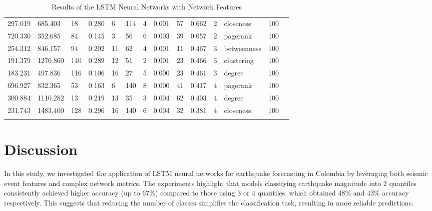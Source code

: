 \documentclass[sn-mathphys-num]{sn-jnl}
\begin{document}
\begin{table}
{\begin{tabular}{@{}llllllllllllll@{}}
            297.019  & 685.403   & 18       & 0.280     & 6          & 114         & 4           & 0.001 & 57         & 0.662    & 2         & closeness        & 100       \\
            720.330  & 352.685   & 84       & 0.145     & 3          & 56          & 6           & 0.003 & 39         & 0.657    & 2         & pagerank         & 100       \\
            \midrule
            254.312  & 846.157   & 94       & 0.202     & 11         & 62          & 4           & 0.001 & 11         & 0.467    & 3         & betweenness      & 100       \\
            191.379  & 1270.860  & 140      & 0.289     & 12         & 51          & 2           & 0.001 & 23         & 0.466    & 3         & clustering       & 100       \\
            183.231  & 497.836   & 116      & 0.106     & 16         & 27          & 5           & 0.000 & 23         & 0.461    & 3         & degree           & 100       \\
            \midrule
            696.927  & 832.365   & 53       & 0.163     & 6          & 140         & 8           & 0.000 & 41         & 0.417    & 4         & pagerank         & 100       \\
            300.884  & 1110.282  & 13       & 0.219     & 13         & 35          & 3           & 0.004 & 62         & 0.403    & 4         & degree           & 100       \\
            231.743  & 1483.400  & 128      & 0.296     & 16         & 140         & 6           & 0.004 & 32         & 0.381    & 4         & closeness        & 100       \\
            \botrule
        \end{tabular}
    }
    \caption{Results of the LSTM Neural Networks with Network Features}\label{tab3}
\end{table}
\unskip

\section{Discussion}\label{discussion}

In this study, we investigated the application of LSTM neural networks for earthquake forecasting in Colombia by leveraging both seismic event features and complex network metrics. The experiments highlight that models classifying earthquake magnitude into 2 quantiles consistently achieved higher accuracy (up to 67\%) compared to those using 3 or 4 quantiles, which obtained 48\% and 43\% accuracy respectively. This suggests that reducing the number of classes simplifies the classification task, resulting in more reliable predictions.
\end{document}

